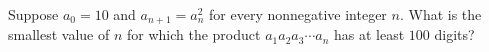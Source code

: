 Suppose $a_0=10$ and $a_{n+1}=a_n^2$ for every nonnegative integer $n$. What is the smallest value of $n$ for which the product $a_1a_2a_3\cdots a_n$ has at least $100$ digits?
